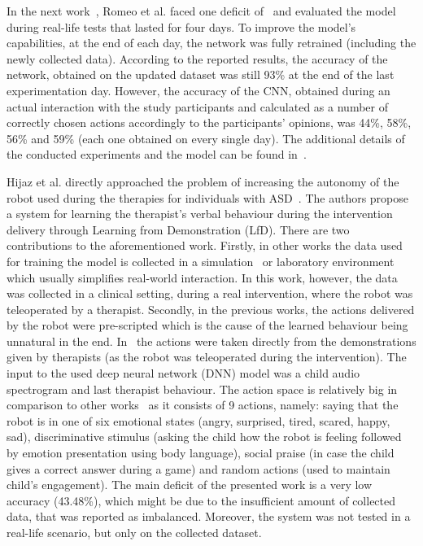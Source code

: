 \documentclass[thesis]{mas_proposal}
\begin{document}
In the next work~\cite{Romeo2019}, Romeo et al. faced one deficit of~\cite{Romeo2018} and evaluated the model during real-life tests that lasted for four days. To improve the model's capabilities, at the end of each day, the network was fully retrained (including the newly collected data). According to the reported results, the accuracy of the network, obtained on the updated dataset was still 93\% at the end of the last experimentation day. However, the accuracy of the CNN, obtained during an actual interaction with the study participants and calculated as a number of correctly chosen actions accordingly to the participants' opinions, was 44\%, 58\%, 56\% and 59\% (each one obtained on every single day). The additional details of the conducted experiments and the model can be found in~\cite{romeo2021human}.

Hijaz et al. directly approached the problem of increasing the autonomy of the robot used during the therapies for individuals with ASD~\cite{Hijaz2021}. The authors propose a system for learning the therapist's verbal behaviour during the intervention delivery through Learning from Demonstration (LfD). There are two contributions to the aforementioned work. Firstly, in other works the data used for training the model is collected in a simulation~\cite{Turner2018,Belo2021,Belo2022} or laboratory environment~\cite{ClarkTurner2017,Turner2018,Romeo2018,carpio2019learning} which usually simplifies real-world interaction. In this work, however, the data was collected in a clinical setting, during a real intervention, where the robot was teleoperated by a therapist. Secondly, in the previous works, the actions delivered by the robot were pre-scripted which is the cause of the learned behaviour being unnatural in the end. In~\cite{Hijaz2021} the actions were taken directly from the demonstrations given by therapists (as the robot was teleoperated during the intervention). The input to the used deep neural network (DNN) model was a child audio spectrogram and last therapist behaviour. The action space is relatively big in comparison to other works~\cite{Qureshi2016,Qureshi2017,Qureshi2018,ClarkTurner2017,Turner2018,Belo2021,Belo2022,Romeo2018,Romeo2019} as it consists of 9 actions, namely: saying that the robot is in one of six emotional states (angry, surprised, tired, scared, happy, sad), discriminative stimulus (asking the child how the robot is feeling followed by emotion presentation using body language), social praise (in case the child gives a correct answer during a game) and random actions (used to maintain child's engagement). The main deficit of the presented work is a very low accuracy (43.48\%), which might be due to the insufficient amount of collected data, that was reported as imbalanced. Moreover, the system was not tested in a real-life scenario, but only on the collected dataset. 
\end{document}
